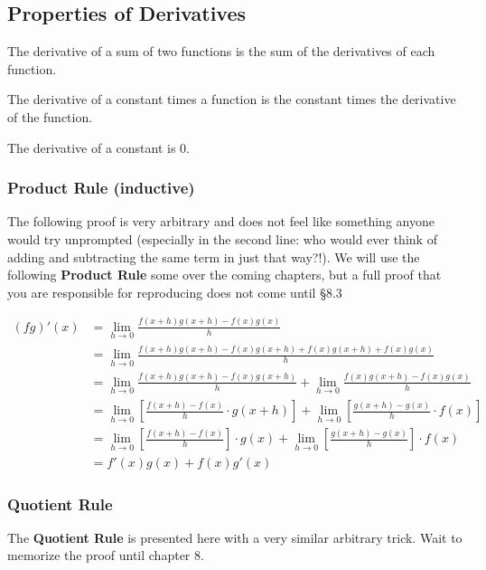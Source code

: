 
\subsection{Properties of Derivatives}



The derivative of a sum of two functions is the sum of the derivatives of each function.

The derivative of a constant times a function is the constant times the derivative of the function.

The derivative of a constant is 0.

\subsubsection{Product Rule (inductive)}
The following proof is very arbitrary and does not feel like something anyone would try
unprompted (especially in the second line: who would ever think of adding and subtracting the same
term in just that way?!).  We will use the following \textbf{Product Rule} some over the coming chapters,
but a full proof that you are responsible for reproducing does not come until §8.3

\begin{align*}
  (fg)'(x) & = \lim_{h\rightarrow0}\frac{f(x+h)g(x+h) - f(x)g(x)}{h} \\
  	&= \lim_{h\rightarrow0}\frac{f(x+h)g(x+h) - f(x)g(x+h) + f(x)g(x+h) + f(x)g(x)}{h} \\
	&= \lim_{h\rightarrow0}\frac{f(x+h)g(x+h) - f(x)g(x+h)}{h} + \lim_{h\rightarrow0}\frac{f(x)g(x+h)-f(x)g(x)}{h} \\
	&= \lim_{h\rightarrow0}\left[\frac{f(x+h) - f(x)}{h} \cdot g(x+h)\right] + \lim_{h\rightarrow0}\left[\frac{g(x+h)-g(x)}{h} \cdot f(x)\right] \\
	&= \lim_{h\rightarrow0}\left[\frac{f(x+h) - f(x)}{h}\right] \cdot g(x) + \lim_{h\rightarrow0}\left[\frac{g(x+h)-g(x)}{h}\right] \cdot f(x)\\
	&=f'(x)g(x) + f(x)g'(x)
\end{align*}

\subsubsection{Quotient Rule}
The \textbf{Quotient Rule} is presented here with a very similar arbitrary trick.  Wait to memorize the proof until chapter 8.

